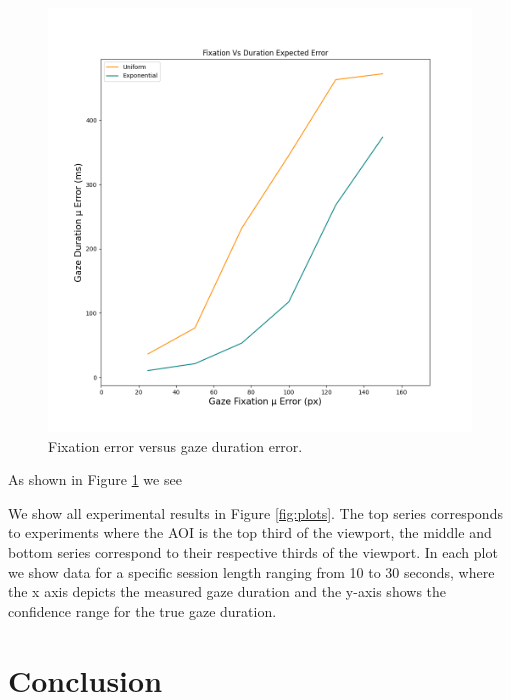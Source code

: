\documentclass[12pt,a4paper]{article}
\numberwithin{equation}{section}
\begin{document}
\begin{figure}[h!]
\includegraphics[scale=0.5]{../results/Fixation_vs_duration_error.png}
\caption{Fixation error versus gaze duration error.}
\label{fig:fixation_vs_duration}
\end{figure}

As shown in Figure \ref{fig:fixation_vs_duration} we see


We show all experimental results in Figure \ref{fig:plots}. The top series corresponds
to experiments where the AOI is the top third of the viewport, the middle and bottom 
series correspond to their respective thirds of the viewport. In each plot we show
data for a specific session length ranging from 10 to 30 seconds, where the x axis
depicts the measured gaze duration and the y-axis shows the confidence range for the
true gaze duration.  


\section{Conclusion}





\end{document}
